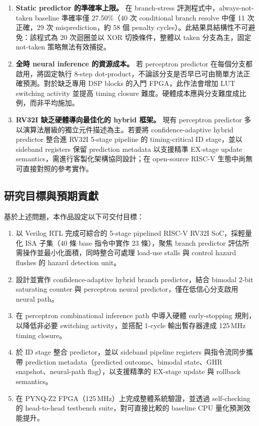 \documentclass[12pt,a4paper]{article}
\begin{document}
	\begin{enumerate}
		\item \textbf{Static predictor 的準確率上限。}
		      在 branch-stress 評測程式中，always-not-taken baseline 準確率僅 27.50\%（40 次 conditional branch resolve 中僅 11 次正確，29 次 misprediction，約 58 個 penalty cycles）。此結果具結構性不可避免：該程式為 20 次迴圈並以 XOR 切換條件，整體以 taken 分支為主，固定 not-taken 策略無法有效捕捉。

		\item \textbf{全時 neural inference 的資源成本。}
		      若 perceptron predictor 在每個分支都啟用，將固定執行 8-step dot-product，不論該分支是否早已可由簡單方法正確預測。對於缺乏專用 DSP blocks 的入門 FPGA，此作法會增加 LUT switching activity 並提高 timing closure 難度。硬體成本應與分支難度成比例，而非平均施加。

		\item \textbf{RV32I 缺乏硬體導向最佳化的 hybrid 框架。}
		      現有 perceptron predictor 多以演算法層級的獨立元件描述為主。若要將 confidence-adaptive hybrid predictor 整合進 RV32I 5-stage pipeline 的 timing-critical ID stage，並以 sideband registers 保留 prediction metadata 以支援精準 EX-stage update semantics，需進行客製化架構協同設計；在 open-source RISC-V 生態中尚無可直接對照的參考實作。
	\end{enumerate}

	\subsection{研究目標與預期貢獻}
	\label{sec:objectives}

	基於上述問題，本作品設定以下可交付目標：

	\begin{enumerate}
		\item 以 Verilog RTL 完成可綜合的 5-stage pipelined RISC-V RV32I SoC，採輕量化 ISA 子集（40 條 base 指令中實作 23 條），聚焦 branch predictor 評估所需操作並最小化面積，同時整合可處理 load-use stalls 與 control hazard flushes 的 hazard detection unit。

		\item 設計並實作 confidence-adaptive hybrid branch predictor，結合 bimodal 2-bit saturating counter 與 perceptron neural predictor，僅在低信心分支啟用 neural path。

		\item 在 perceptron combinational inference path 中導入硬體 early-stopping 規則，以降低非必要 switching activity，並搭配 1-cycle 輸出暫存器達成 125\,MHz timing closure。

		\item 於 ID stage 整合 predictor，並以 sideband pipeline registers 與指令流同步攜帶 prediction metadata（predicted outcome、bimodal state、GHR snapshot、neural-path flag），以支援精準的 EX-stage update 與 rollback semantics。

		\item 在 PYNQ-Z2 FPGA（125\,MHz）上完成整體系統驗證，並透過 self-checking 的 head-to-head testbench suite，對可直接比較的 baseline CPU 量化預測效能提升。
	\end{enumerate}
\end{document}
